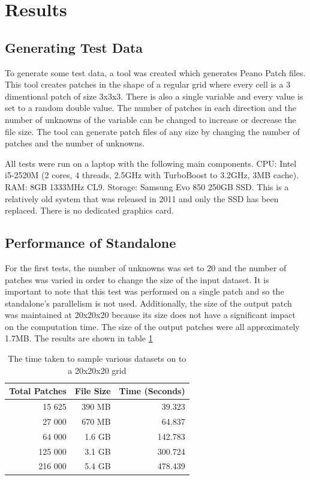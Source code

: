 \documentclass[12pt,a4paper]{article}
\begin{document}
\section{Results}
\subsection{Generating Test Data}
To generate some test data, a tool was created which generates Peano Patch files. This tool creates patches in the shape of a regular grid where every cell is a 3 dimentional patch of size 3x3x3. There is also a single variable and every value is set to a random double value. The number of patches in each direction and the number of unknowns of the variable can be changed to increase or decrease the file size. The tool can generate patch files of any size by changing the number of patches and the number of unknowns.

All tests were run on a laptop with the following main components. CPU: Intel i5-2520M (2 cores, 4 threads, 2.5GHz with TurboBoost to 3.2GHz, 3MB cache). RAM: 8GB 1333MHz CL9. Storage: Samsung Evo 850 250GB SSD. This is a relatively old system that was released in 2011 and only the SSD has been replaced. There is no dedicated graphics card.

\subsection{Performance of Standalone}
For the first tests, the number of unknowns was set to 20 and the number of patches was varied in order to change the size of the input dataset. It is important to note that this test was performed on a single patch and so the standalone's parallelism is not used. Additionally, the size of the output patch was maintained at 20x20x20 because its size does not have a significant impact on the computation time. The size of the output patches were all approximately 1.7MB. The results are shown in table \ref{standalone-table}

\begin{table}[h]
\centering
\begin{tabular}{rrr}
\hline
\multicolumn{1}{l}{Total Patches} & \multicolumn{1}{l}{File Size} & \multicolumn{1}{l}{Time (Seconds)} \\ \hline
15 625                            & 390 MB                         & 39.323                             \\
27 000                            & 670 MB                        & 64.837                             \\
64 000                            & 1.6 GB                        & 142.783                            \\
125 000                           & 3.1 GB                        & 300.724                            \\
216 000                           & 5.4 GB                        & 478.439                            \\ \hline
\end{tabular}
\caption{The time taken to sample various datasets on to a 20x20x20 grid}
\label{standalone-table}
\end{table}
\end{document}
